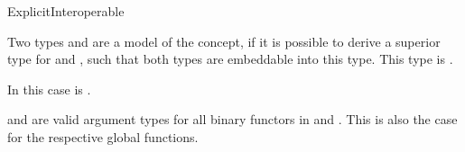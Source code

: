 \begin{ccRefConcept}{ExplicitInteroperable}

\ccDefinition

Two types  and  are a model of the  
concept, if it is possible to derive a superior type for  and ,
such that both types are embeddable into this type. 
This type is .  

In this case  
is .

 and  are valid argument types for all binary functors in 
 and .   
This is also the case for the respective global functions. 

\ccSeeAlso
{}\\
\\
\\
\\

\end{ccRefConcept}
